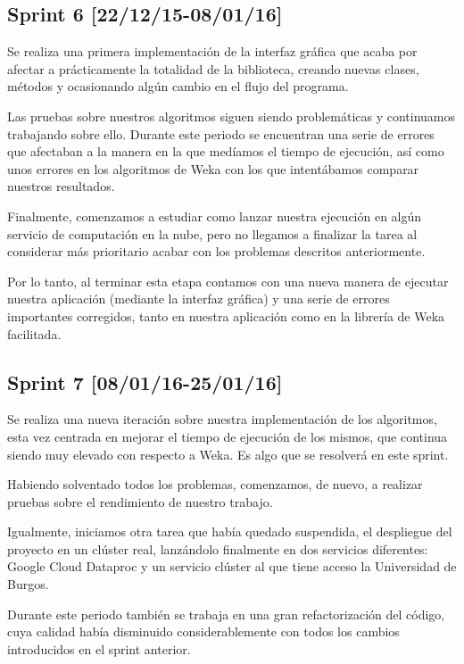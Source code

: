 \subsection{Sprint 6 [22/12/15-08/01/16]}

Se realiza una primera implementación de la interfaz gráfica que acaba por afectar a prácticamente la totalidad de la biblioteca, creando nuevas clases, métodos y ocasionando algún cambio en el flujo del programa.

Las pruebas sobre nuestros algoritmos siguen siendo problemáticas y continuamos trabajando sobre ello. Durante este periodo se encuentran una serie de errores que afectaban a la manera en la que medíamos el tiempo de ejecución, así como unos errores en los algoritmos de Weka con los que intentábamos comparar nuestros resultados.

Finalmente, comenzamos a estudiar como lanzar nuestra ejecución en algún servicio de computación en la nube, pero no llegamos a finalizar la tarea al considerar más prioritario acabar con los problemas descritos anteriormente.

Por lo tanto, al terminar esta etapa contamos con una nueva manera de ejecutar nuestra aplicación (mediante la interfaz gráfica) y una serie de errores importantes corregidos, tanto en nuestra aplicación como en la librería de Weka facilitada.

\subsection{Sprint 7 [08/01/16-25/01/16]}

Se realiza una nueva iteración sobre nuestra implementación de los algoritmos, esta vez centrada en mejorar el tiempo de ejecución de los mismos, que continua siendo muy elevado con respecto a Weka. Es algo que se resolverá en este sprint.

Habiendo solventado todos los problemas, comenzamos, de nuevo, a realizar pruebas sobre el rendimiento de nuestro trabajo.

Igualmente, iniciamos otra tarea que había quedado suspendida, el despliegue del proyecto en un clúster real, lanzándolo finalmente en dos servicios diferentes: Google Cloud Dataproc \cite{dataprocSoft} y un servicio clúster al que tiene acceso la Universidad de Burgos.

Durante este periodo también se trabaja en una gran refactorización del código, cuya calidad había disminuido considerablemente con todos los cambios introducidos en el sprint anterior.

